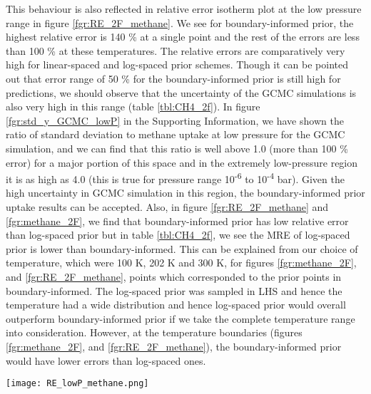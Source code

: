 \documentclass[twoside,twocolumn,9pt]{article}
\begin{document}
This behaviour is also reflected in relative error isotherm plot at the low pressure range in figure \ref{fgr:RE_2F_methane}. We see for boundary-informed prior, the highest relative error is 140 \% at a single point and the rest of the errors are less than 100 \% at these temperatures. The relative errors are comparatively very high for linear-spaced and log-spaced prior schemes. Though it can be pointed out that error range of 50 \% for the boundary-informed prior is still high for predictions, we should observe that the uncertainty of the GCMC simulations is also very high in this range (table \ref{tbl:CH4_2f}). In figure \ref{fgr:std_y_GCMC_lowP} in the Supporting Information, we have shown the ratio of standard deviation to methane uptake at low pressure for the GCMC simulation, and we can find that this ratio is well above 1.0 (more than 100 \% error) for a major portion of this space and in the extremely low-pressure region it is as high as 4.0 (this is true for pressure range 10\textsuperscript{-6} to 10\textsuperscript{-4} bar). Given the high uncertainty in GCMC simulation in this region, the boundary-informed prior uptake results can be accepted. Also, in figure \ref{fgr:RE_2F_methane} and \ref{fgr:methane_2F}, we find that boundary-informed prior has low relative error than log-spaced prior but in table \ref{tbl:CH4_2f}, we see the MRE of log-spaced prior is lower than boundary-informed. This can be explained from our choice of temperature, which were 100 K, 202 K and 300 K, for figures \ref{fgr:methane_2F}, and \ref{fgr:RE_2F_methane}, points which corresponded to the prior points in boundary-informed. The log-spaced prior was sampled in LHS and hence the temperature had a wide distribution and hence log-spaced prior would overall outperform boundary-informed prior if we take the complete temperature range into consideration. However, at the temperature boundaries (figures \ref{fgr:methane_2F}, and \ref{fgr:RE_2F_methane}), the boundary-informed prior would have lower errors than log-spaced ones.

\begin{figure*}
\centering
  \texttt{[image: RE\_lowP\_methane.png]}
  \caption{Relative error (in \%) comparison between GP and GCMC simulation in Cu-BTC at low pressure range for different priors, a) Boundary-informed prior, b) Linear-spaced LHS prior, and c) Log-spaced LHS prior}
  \label{fgr:RE_2F_methane}
\end{figure*}
\end{document}
